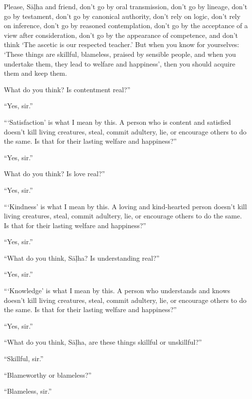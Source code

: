 \documentclass[12pt,openany]{book}%
\begin{document}
Please, \textsanskrit{Sāḷha} and friend, don’t go by oral transmission, don’t go by lineage, don’t go by testament, don’t go by canonical authority, don’t rely on logic, don’t rely on inference, don’t go by reasoned contemplation, don’t go by the acceptance of a view after consideration, don’t go by the appearance of competence, and don’t think ‘The ascetic is our respected teacher.’ But when you know for yourselves: ‘These things are skillful, blameless, praised by sensible people, and when you undertake them, they lead to welfare and happiness’, then you should acquire them and keep them. 

What do you think? Is contentment real?” 

“Yes, sir.” 

“‘Satisfaction’ is what I mean by this. A person who is content and satisfied doesn’t kill living creatures, steal, commit adultery, lie, or encourage others to do the same. Is that for their lasting welfare and happiness?” 

“Yes, sir.” 

What do you think? Is love real?” 

“Yes, sir.” 

“‘Kindness’ is what I mean by this. A loving and kind-hearted person doesn’t kill living creatures, steal, commit adultery, lie, or encourage others to do the same. Is that for their lasting welfare and happiness?” 

“Yes, sir.” 

“What do you think, \textsanskrit{Sāḷha}? Is understanding real?” 

“Yes, sir.” 

“‘Knowledge’ is what I mean by this. A person who understands and knows doesn’t kill living creatures, steal, commit adultery, lie, or encourage others to do the same. Is that for their lasting welfare and happiness?” 

“Yes, sir.” 

“What do you think, \textsanskrit{Sāḷha}, are these things skillful or unskillful?” 

“Skillful, sir.” 

“Blameworthy or blameless?” 

“Blameless, sir.” 
\end{document}
